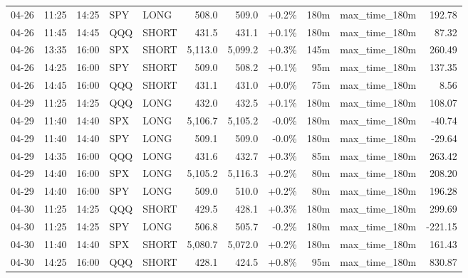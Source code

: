 \documentclass[11pt,a4paper,twoside]{article}
\begin{document}
\begin{center}
\begin{longtable}{>{\color{txtmain}}l l l l l r r r r >{\color{txtmain}}l r}
04-26 & 11:25 & 14:25 & SPY & LONG & 508.0 & 509.0 & \textcolor{wingreen}{+0.2\%} & 180m & max\_time\_180m & \textcolor{wingreen}{192.78} \\
04-26 & 11:45 & 14:45 & QQQ & SHORT & 431.5 & 431.1 & \textcolor{wingreen}{+0.1\%} & 180m & max\_time\_180m & \textcolor{wingreen}{87.32} \\
04-26 & 13:35 & 16:00 & SPX & SHORT & 5,113.0 & 5,099.2 & \textcolor{wingreen}{+0.3\%} & 145m & max\_time\_180m & \textcolor{wingreen}{260.49} \\
04-26 & 14:25 & 16:00 & SPY & SHORT & 509.0 & 508.2 & \textcolor{wingreen}{+0.1\%} & 95m & max\_time\_180m & \textcolor{wingreen}{137.35} \\
04-26 & 14:45 & 16:00 & QQQ & SHORT & 431.1 & 431.0 & \textcolor{wingreen}{+0.0\%} & 75m & max\_time\_180m & \textcolor{wingreen}{8.56} \\
04-29 & 11:25 & 14:25 & QQQ & LONG & 432.0 & 432.5 & \textcolor{wingreen}{+0.1\%} & 180m & max\_time\_180m & \textcolor{wingreen}{108.07} \\
04-29 & 11:40 & 14:40 & SPX & LONG & 5,106.7 & 5,105.2 & \textcolor{lossred}{-0.0\%} & 180m & max\_time\_180m & \textcolor{lossred}{-40.74} \\
04-29 & 11:40 & 14:40 & SPY & LONG & 509.1 & 509.0 & \textcolor{lossred}{-0.0\%} & 180m & max\_time\_180m & \textcolor{lossred}{-29.64} \\
04-29 & 14:35 & 16:00 & QQQ & LONG & 431.6 & 432.7 & \textcolor{wingreen}{+0.3\%} & 85m & max\_time\_180m & \textcolor{wingreen}{263.42} \\
04-29 & 14:40 & 16:00 & SPX & LONG & 5,105.2 & 5,116.3 & \textcolor{wingreen}{+0.2\%} & 80m & max\_time\_180m & \textcolor{wingreen}{208.20} \\
04-29 & 14:40 & 16:00 & SPY & LONG & 509.0 & 510.0 & \textcolor{wingreen}{+0.2\%} & 80m & max\_time\_180m & \textcolor{wingreen}{196.28} \\
04-30 & 11:25 & 14:25 & QQQ & SHORT & 429.5 & 428.1 & \textcolor{wingreen}{+0.3\%} & 180m & max\_time\_180m & \textcolor{wingreen}{299.69} \\
04-30 & 11:25 & 14:25 & SPY & LONG & 506.8 & 505.7 & \textcolor{lossred}{-0.2\%} & 180m & max\_time\_180m & \textcolor{lossred}{-221.15} \\
04-30 & 11:40 & 14:40 & SPX & SHORT & 5,080.7 & 5,072.0 & \textcolor{wingreen}{+0.2\%} & 180m & max\_time\_180m & \textcolor{wingreen}{161.43} \\
04-30 & 14:25 & 16:00 & QQQ & SHORT & 428.1 & 424.5 & \textcolor{wingreen}{+0.8\%} & 95m & max\_time\_180m & \textcolor{wingreen}{830.87} \\

\end{longtable}
\end{center}
\end{document}
